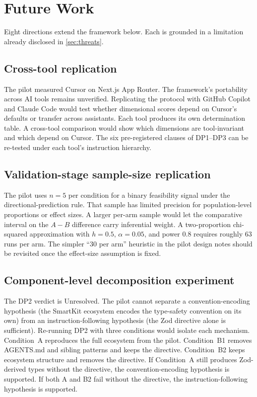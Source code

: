 \documentclass[12pt,a4paper]{report}
\begin{document}
\section{Future Work}
\label{sec:future-work}

Eight directions extend the framework below. Each is grounded in a limitation already disclosed in \autoref{sec:threats}.

\subsection{Cross-tool replication}

The pilot measured Cursor on Next.js App Router. The framework's portability across AI tools remains unverified. Replicating the protocol with GitHub Copilot and Claude Code would test whether dimensional scores depend on Cursor's defaults or transfer across assistants. Each tool produces its own determination table. A cross-tool comparison would show which dimensions are tool-invariant and which depend on Cursor. The six pre-registered clauses of DP1--DP3 can be re-tested under each tool's instruction hierarchy.

\subsection{Validation-stage sample-size replication}

The pilot uses $n=5$ per condition for a binary feasibility signal under the directional-prediction rule. That sample has limited precision for population-level proportions or effect sizes. A larger per-arm sample would let the comparative interval on the $A-B$ difference carry inferential weight. A two-proportion chi-squared approximation with $h = 0.5$, $\alpha = 0.05$, and power $0.8$ requires roughly $63$ runs per arm. The simpler ``$30$ per arm'' heuristic in the pilot design notes should be revisited once the effect-size assumption is fixed.

\subsection{Component-level decomposition experiment}

The DP2 verdict is Unresolved. The pilot cannot separate a convention-encoding hypothesis (the SmartKit ecosystem encodes the type-safety convention on its own) from an instruction-following hypothesis (the Zod directive alone is sufficient). Re-running DP2 with three conditions would isolate each mechanism. Condition~A reproduces the full ecosystem from the pilot. Condition~B1 removes AGENTS.md and sibling patterns and keeps the directive. Condition~B2 keeps ecosystem structure and removes the directive. If Condition~A still produces Zod-derived types without the directive, the convention-encoding hypothesis is supported. If both A and B2 fail without the directive, the instruction-following hypothesis is supported.
\end{document}
